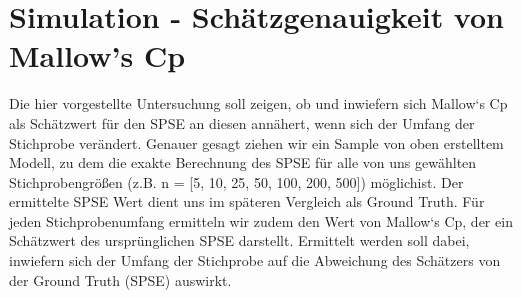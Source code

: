 \section{Simulation - Schätzgenauigkeit von Mallow's Cp}
Die hier vorgestellte Untersuchung soll zeigen, ob und inwiefern sich Mallow‘s Cp als Schätzwert für den SPSE an diesen annähert, wenn sich der Umfang der Stichprobe verändert.
Genauer gesagt ziehen wir ein Sample von oben erstelltem Modell, zu dem die exakte Berechnung des SPSE für alle von uns gewählten Stichprobengrößen (z.B. n = [5, 10, 25, 50, 100, 200, 500]) möglichist. Der ermittelte SPSE Wert dient uns im späteren Vergleich als Ground Truth. Für jeden Stichprobenumfang ermitteln wir zudem den Wert von Mallow‘s Cp, der ein Schätzwert des ursprünglichen SPSE darstellt. Ermittelt werden soll dabei, inwiefern sich der Umfang der Stichprobe auf die Abweichung des Schätzers von der Ground Truth (SPSE) auswirkt. 

	

